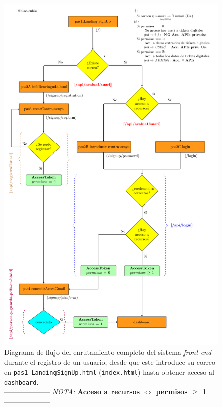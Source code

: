 \documentclass[a4paper,12pt]{report}
\begin{document}
	
	\setlength{\belowcaptionskip}{3pt}
	\FloatBarrier
	\begin{figure}[H]
		\centering
		\caption{Diagrama de flujo del enrutamiento completo del sistema \textit{front-end} durante el registro de un usuario, desde que este introduce su correo en \texttt{pas1\_LandingSignUp.html} (\texttt{index.html}) hasta obtener acceso al \texttt{dashboard}.\\ -------------------- \textit{NOTA:} \textbf{Acceso a recursos $\iff$ permisos $\geq$ 1} --------------------}
		\includegraphics[width=1\textwidth]{img/diagramaMercAppFront.pdf}
		
		\label{fig:diagramaMercaAppFront} 
	\end{figure}
	\FloatBarrier
	
\end{document}
